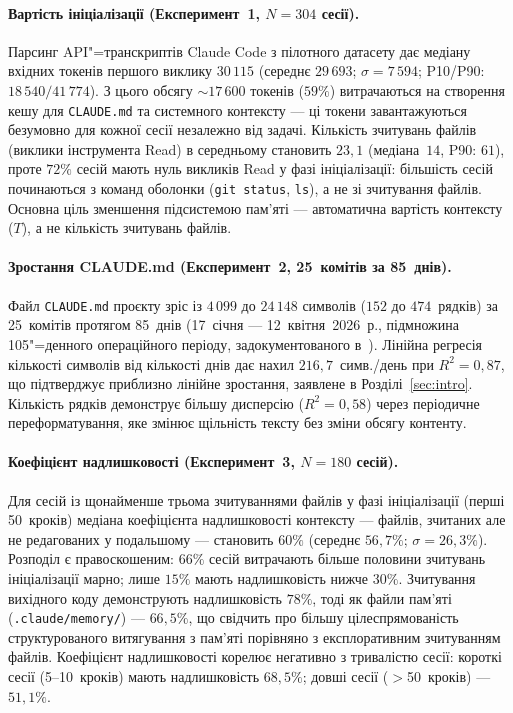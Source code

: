 \paragraph{Вартість ініціалізації (Експеримент~1, $N{=}304$ сесії).}
Парсинг API"=транскриптів Claude Code з пілотного датасету дає медіану вхідних токенів першого виклику $30\,115$ (середнє $29\,693$; $\sigma{=}7\,594$; P10/P90: $18\,540/41\,774$).
З цього обсягу ${\sim}17\,600$ токенів ($59\%$) витрачаються на створення кешу для \texttt{CLAUDE.md} та системного контексту --- ці токени завантажуються безумовно для кожної сесії незалежно від задачі.
Кількість зчитувань файлів (виклики інструмента Read) в середньому становить $23{,}1$ (медіана~$14$, P90: $61$), проте $72\%$ сесій мають нуль викликів Read у фазі ініціалізації: більшість сесій починаються з команд оболонки (\texttt{git status}, \texttt{ls}), а не зі зчитування файлів.
Основна ціль зменшення підсистемою пам'яті --- автоматична вартість контексту ($T$), а не кількість зчитувань файлів.

\paragraph{Зростання CLAUDE.md (Експеримент~2, 25~комітів за 85~днів).}
Файл \texttt{CLAUDE.md} проєкту зріс із $4\,099$ до $24\,148$ символів ($152$ до $474$~рядків) за 25~комітів протягом 85~днів (17~січня --- 12~квітня~2026~р., підмножина 105"=денного операційного періоду, задокументованого в~\citep{ovcharov2026edittrace}).
Лінійна регресія кількості символів від кількості днів дає нахил $216{,}7$~симв./день при $R^2 = 0{,}87$, що підтверджує приблизно лінійне зростання, заявлене в Розділі~\ref{sec:intro}.
Кількість рядків демонструє більшу дисперсію ($R^2 = 0{,}58$) через періодичне переформатування, яке змінює щільність тексту без зміни обсягу контенту.

\paragraph{Коефіцієнт надлишковості (Експеримент~3, $N{=}180$ сесій).}
Для сесій із щонайменше трьома зчитуваннями файлів у фазі ініціалізації (перші 50~кроків) медіана коефіцієнта надлишковості контексту --- файлів, зчитаних але не редагованих у подальшому --- становить $60\%$ (середнє $56{,}7\%$; $\sigma{=}26{,}3\%$).
Розподіл є правоскошеним: $66\%$ сесій витрачають більше половини зчитувань ініціалізації марно; лише $15\%$ мають надлишковість нижче $30\%$.
Зчитування вихідного коду демонструють надлишковість $78\%$, тоді як файли пам'яті (\texttt{.claude/memory/}) --- $66{,}5\%$, що свідчить про більшу цілеспрямованість структурованого витягування з пам'яті порівняно з експлоративним зчитуванням файлів.
Коефіцієнт надлишковості корелює негативно з тривалістю сесії: короткі сесії (5--10~кроків) мають надлишковість $68{,}5\%$; довші сесії ($>$50~кроків) --- $51{,}1\%$.

